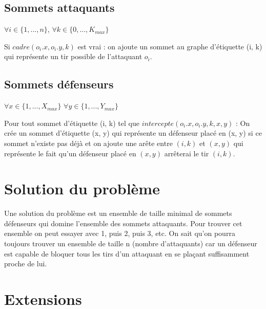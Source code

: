\documentclass[12pt]{report}
\begin{document}
\subsection{Sommets attaquants}
$\forall i \in \{1, ..., n\}$, $\forall k \in \{0, ..., K_{max} \}$

Si $cadre(o_i.x, o_i.y, k)$ est vrai : on ajoute un sommet au graphe d'étiquette (i, k) qui représente un tir possible de l'attaquant $o_i$. \bigbreak

\subsection{Sommets défenseurs}
$\forall x \in \{1, ..., X_{max}\}$ $\forall y \in \{1, ..., Y_{max}\}$ 

Pour tout sommet d'étiquette (i, k) tel que $intercepte(o_i.x, o_i.y, k, x, y)$ : On crée un sommet d'étiquette (x, y) qui représente un défenseur placé en (x, y) si ce sommet n'existe pas déjà et on ajoute une arête entre $(i, k)$ et $(x, y)$ qui représente le fait qu'un défenseur placé en $(x, y)$ arrêterai le tir $(i, k)$.

\section{Solution du problème}
Une solution du problème est un ensemble de taille minimal de sommets défenseurs qui domine l'ensemble des sommets attaquants.
Pour trouver cet ensemble on peut essayer avec 1, puis 2, puis 3, etc. On sait qu'on pourra toujours trouver un ensemble de taille n (nombre d'attaquants) car un défenseur est capable de bloquer tous les tirs d'un attaquant en se plaçant suffisamment proche de lui. 

\section{Extensions}
\end{document}

